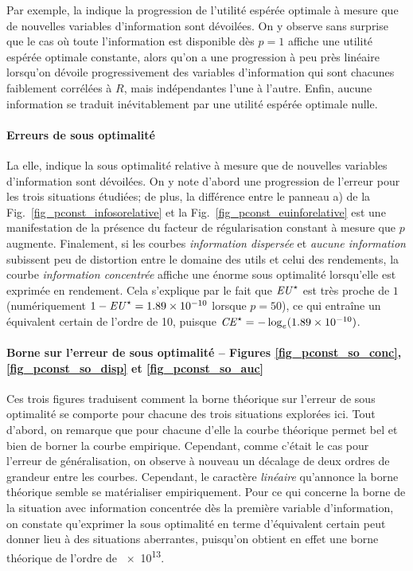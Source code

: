 Par exemple, la  indique la progression de l'utilité
espérée optimale à mesure que de nouvelles variables d'information sont dévoilées. On y
observe sans surprise que le cas où toute l'information est disponible dès $p=1$ affiche
une utilité espérée optimale constante, alors qu'on a une progression à peu près linéaire
lorsqu'on dévoile progressivement des variables d'information qui sont chacunes faiblement
corrélées à $R$, mais indépendantes l'une à l'autre. Enfin, aucune information se traduit
inévitablement par une utilité espérée optimale nulle.

\paragraph{Erreurs de sous optimalité}

La  elle, indique la sous optimalité relative à mesure
que de nouvelles variables d'information sont dévoilées. On y note d'abord une progression
de l'erreur pour les trois situations étudiées; de plus, la différence entre le panneau a)
de la Fig.~\ref{fig_pconst_infosorelative} et la Fig.~\ref{fig_pconst_euinforelative} est
une manifestation de la présence du facteur de régularisation constant à mesure que $p$
augmente. Finalement, si les courbes \textit{information dispersée} et \textit{aucune
  information} subissent peu de distortion entre le domaine des utils et celui des
rendements, la courbe \textit{information concentrée} affiche une énorme sous optimalité
lorsqu'elle est exprimée en rendement. Cela s'explique par le fait que $\operatorname{\mbox{\textit{EU}}}^\star$ est très
proche de $1$ (numériquement $1-\operatorname{\mbox{\textit{EU}}}^\star = \num{1.89e-10}$ lorsque $p=50$), ce qui entraîne
un équivalent certain de l'ordre de \num{10}, puisque $\operatorname{\mbox{\textit{CE}}}^\star = -\log_e(\num{1.89e-10})$.


\paragraph{Borne sur l'erreur de sous optimalité -- Figures \ref{fig_pconst_so_conc},
  \ref{fig_pconst_so_disp} et \ref{fig_pconst_so_auc}}

Ces trois figures traduisent comment la borne théorique sur l'erreur de sous optimalité se
comporte pour chacune des trois situations explorées ici. Tout d'abord, on remarque que
pour chacune d'elle la courbe théorique permet bel et bien de borner la courbe
empirique. Cependant, comme c'était le cas pour l'erreur de généralisation, on observe à
nouveau un décalage de deux ordres de grandeur entre les courbes. Cependant, le caractère
\textit{linéaire} qu'annonce la borne théorique semble se matérialiser empiriquement. Pour
ce qui concerne la borne de la situation avec information concentrée dès la première
variable d'information, on constate qu'exprimer la sous optimalité en terme d'équivalent
certain peut donner lieu à des situations aberrantes, puisqu'on obtient en effet une borne
théorique de l'ordre de \num{e13}. 

